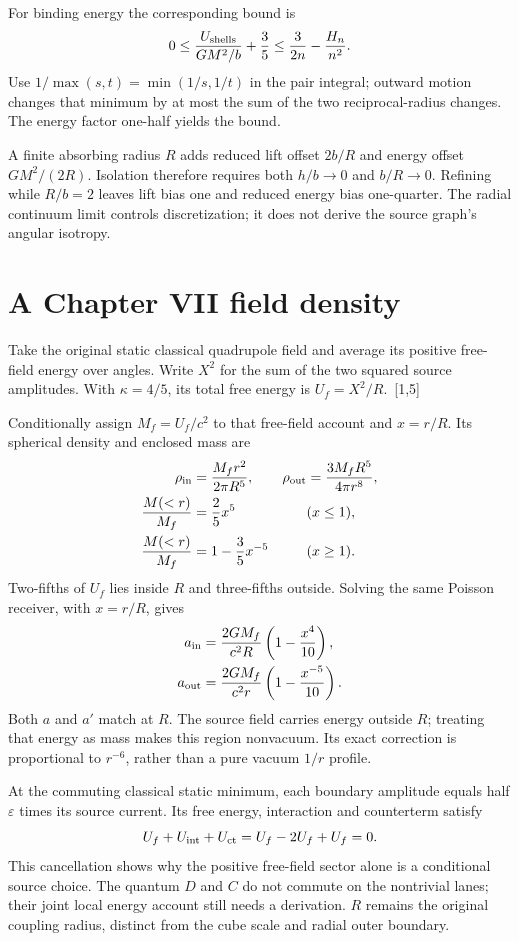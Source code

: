 \documentclass[10pt,twocolumn,letterpaper]{article}
\begin{document}
For binding energy the corresponding bound is
\[
0\leq\frac{U_{\rm shells}}{GM^2/b}+\frac35\leq\frac3{2n}-\frac{H_n}{n^2}.
\]
Use $1/\max(s,t)=\min(1/s,1/t)$ in the pair integral; outward motion changes that minimum by at most the sum of the two reciprocal-radius changes. The energy factor one-half yields the bound.

A finite absorbing radius $R$ adds reduced lift offset $2b/R$ and energy offset $GM^2/(2R)$. Isolation therefore requires both $h/b\to0$ and $b/R\to0$. Refining while $R/b=2$ leaves lift bias one and reduced energy bias one-quarter. The radial continuum limit controls discretization; it does not derive the source graph's angular isotropy.

\section{A Chapter VII field density}
Take the original static classical quadrupole field and average its positive free-field energy over angles. Write $X^2$ for the sum of the two squared source amplitudes. With $\kappa=4/5$, its total free energy is $U_f=X^2/R$.~[1,5]

Conditionally assign $M_f=U_f/c^2$ to that free-field account and $x=r/R$. Its spherical density and enclosed mass are
\[
\begin{aligned}
\rho_{\rm in}&=\frac{M_fr^2}{2\pi R^5},&\rho_{\rm out}&=\frac{3M_fR^5}{4\pi r^8},\\
\frac{M(<r)}{M_f}&=\frac25x^5&& (x\leq1),\\
\frac{M(<r)}{M_f}&=1-\frac35x^{-5}&& (x\geq1).
\end{aligned}
\]
Two-fifths of $U_f$ lies inside $R$ and three-fifths outside. Solving the same Poisson receiver, with $x=r/R$, gives
\[
\begin{aligned}
a_{\rm in}&=\frac{2GM_f}{c^2R}\left(1-\frac{x^4}{10}\right),\\
a_{\rm out}&=\frac{2GM_f}{c^2r}\left(1-\frac{x^{-5}}{10}\right).
\end{aligned}
\]
Both $a$ and $a'$ match at $R$. The source field carries energy outside $R$; treating that energy as mass makes this region nonvacuum. Its exact correction is proportional to $r^{-6}$, rather than a pure vacuum $1/r$ profile.

At the commuting classical static minimum, each boundary amplitude equals half $\varepsilon$ times its source current. Its free energy, interaction and counterterm satisfy
\[
U_f+U_{\rm int}+U_{\rm ct}=U_f-2U_f+U_f=0.
\]
This cancellation shows why the positive free-field sector alone is a conditional source choice. The quantum $D$ and $C$ do not commute on the nontrivial lanes; their joint local energy account still needs a derivation. $R$ remains the original coupling radius, distinct from the cube scale and radial outer boundary.
\end{document}
